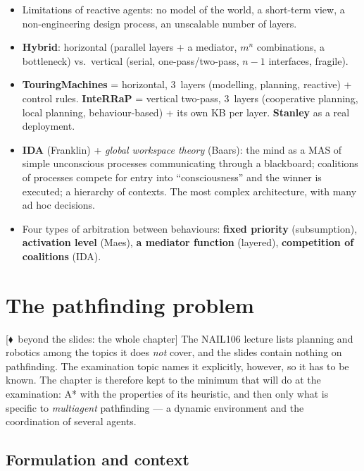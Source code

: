 \documentclass[11pt,a4paper]{article}
\theoremstyle{definition}
\providecommand{\uv}[1]{``#1''}
\newcommand{\mimoq}[1]{\textcolor{markcol}{\textsf{\footnotesize[$\blacklozenge$~beyond the slides: #1]}}}
\begin{document}
\begin{itemize}
  above the threshold is selected. The parameters $\gamma/\phi$ tune proactiveness
  vs.\ reactivity.
\item Limitations of reactive agents: no model of the world, a short-term view, a
  non-engineering design process, an unscalable number of layers.
\item \textbf{Hybrid}: horizontal (parallel layers + a mediator, $m^n$ combinations, a
  bottleneck) vs.\ vertical (serial, one-pass/two-pass, $n-1$ interfaces, fragile).
\item \textbf{TouringMachines} = horizontal, 3~layers (modelling, planning, reactive) + control
  rules. \textbf{InteRRaP} = vertical two-pass, 3~layers (cooperative planning, local planning,
  behaviour-based) + its own KB per layer. \textbf{Stanley} as a real deployment.
\item \textbf{IDA} (Franklin) + \emph{global workspace theory} (Baars): the mind as a MAS of
  simple unconscious processes communicating through a blackboard; coalitions of processes
  compete for entry into \uv{consciousness} and the winner is executed; a hierarchy of contexts.
  The most complex architecture, with many ad hoc decisions.
\item Four types of arbitration between behaviours: \textbf{fixed priority} (subsumption),
  \textbf{activation level} (Maes), \textbf{a mediator function} (layered), \textbf{competition
  of coalitions} (IDA).
\end{itemize}

\section{The pathfinding problem}
\label{sec:cesta}

\noindent\mimoq{the whole chapter} The NAIL106 lecture lists planning and robotics among the
topics it does \emph{not} cover, and the slides contain nothing on pathfinding. The examination
topic names it explicitly, however, so it has to be known. The chapter is therefore kept to the
minimum that will do at the examination: A* with the properties of its heuristic, and then only
what is specific to \emph{multiagent} pathfinding --- a dynamic environment and the coordination
of several agents.

\subsection{Formulation and context}
\end{document}
